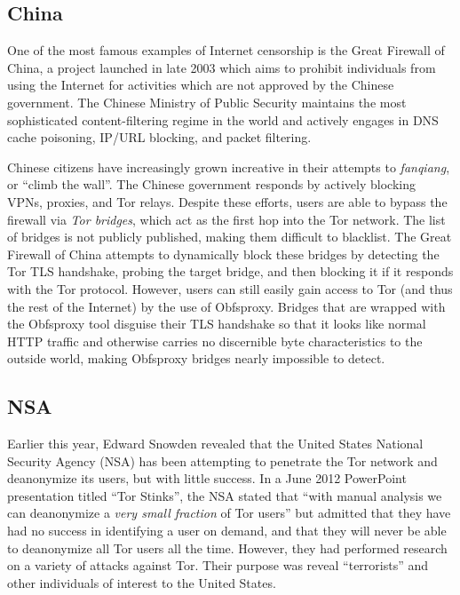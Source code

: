 \documentclass[journal]{IEEEtran}
\begin{document}
\subsection{China}

One of the most famous examples of Internet censorship is the Great Firewall of China, a project launched in late 2003 which aims to prohibit individuals from using the Internet for activities which are not approved by the Chinese government. The Chinese Ministry of Public Security maintains the most sophisticated content-filtering regime in the world and actively engages in DNS cache poisoning, IP/URL blocking, and packet filtering.

Chinese citizens have increasingly grown increative in their attempts to \textit{fanqiang}, or ``climb the wall''. The Chinese government responds by actively blocking VPNs, proxies, and Tor relays. Despite these efforts, users are able to bypass the firewall via \textit{Tor bridges}, which act as the first hop into the Tor network. The list of bridges is not publicly published, making them difficult to blacklist. The Great Firewall of China attempts to dynamically block these bridges by detecting the Tor TLS handshake, probing the target bridge, and then blocking it if it responds with the Tor protocol. However, users can still easily gain access to Tor (and thus the rest of the Internet) by the use of Obfsproxy. Bridges that are wrapped with the Obfsproxy tool disguise their TLS handshake so that it looks like normal HTTP traffic and otherwise carries no discernible byte characteristics to the outside world, making Obfsproxy bridges nearly impossible to detect.\cite{Anderson2013}

\subsection{NSA}

Earlier this year, Edward Snowden revealed that the United States National Security Agency (NSA) has been attempting to penetrate the Tor network and deanonymize its users, but with little success. In a June 2012 PowerPoint presentation titled ``Tor Stinks'', the NSA stated that ``with manual analysis we can deanonymize a \textit{very small fraction} of Tor users'' but admitted that they have had no success in identifying a user on demand, and that they will never be able to deanonymize all Tor users all the time. However, they had performed research on a variety of attacks against Tor. Their purpose was reveal ``terrorists'' and other individuals of interest to the United States.
\end{document}
